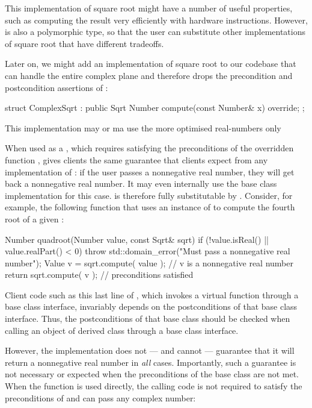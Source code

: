 This implementation of square root might have a number of useful properties, such as computing the result very efficiently with hardware instructions. However,  is also a polymorphic type, so that the user can substitute other implementations of square root that have different tradeoffs.

Later on, we might add an implementation of square root to our codebase that can handle the entire complex plane and therefore drops the precondition and postcondition assertions of :

\begin{codeblock}
struct ComplexSqrt : public Sqrt {
  Number compute(const Number& x) override;
};
\end{codeblock}

This implementation may or ma use the more optimised real-numbers only 

When used as a , which requires satisfying the preconditions of the overridden function , \allowbreak{} gives clients the same guarantee that clients  expect from any implementation of : if the user passes a nonnegative real number, they will get back a nonnegative real number. It may even internally use the base class implementation  for this case.  is therefore fully substitutable by . Consider, for example, the following function that uses an instance of  to compute the fourth root of a given :

\begin{codeblock}
Number quadroot(Number value, const Sqrt& sqrt) {
  if (!value.isReal() || value.realPart() < 0) {
    throw std::domain_error("Must pass a nonnegative real number");
  }
  Value v = sqrt.compute( {value} ); // v is a nonnegative real number
  return sqrt.compute( {v} ); // preconditions satisfied 
}
\end{codeblock}

Client code such as this last line of , which invokes a virtual function through a base class interface, invariably depends on the postconditions of that base class interface. Thus, the postconditions of that base class should be checked when calling an object of derived class through a base class interface.

However, the implementation  does not --- and cannot --- guarantee that it will return a nonnegative real number in \emph{all} cases. Importantly, such a guarantee is not necessary or expected when the preconditions of the base class are not met. When the function  is used directly, the calling code is not required to satisfy the preconditions of  and can pass any complex number:

